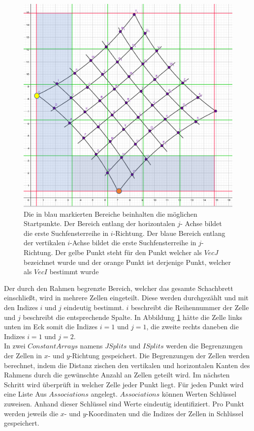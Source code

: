 \begin{figure}[!htb]
	\centering
	\includegraphics[width=0.6\linewidth]{images/VerzeichnetesSchachbrett_1.png}
	\caption[Startpunktsuche in Schachbrettpunkten]{Die in blau markierten Bereiche beinhalten die möglichen Startpunkte. Der Bereich entlang der horizontalen $j$- Achse bildet die erste Suchfensterreihe in $i$-Richtung. Der blaue Bereich entlang der vertikalen $i$-Achse bildet die erste Suchfensterreihe in $j$-Richtung. Der gelbe Punkt steht für den Punkt welcher als $VecJ$ bezeichnet wurde und der orange Punkt ist derjenige Punkt, welcher als $VecI$ bestimmt wurde}
	\label{fig:7.1}
\end{figure}

Der durch den Rahmen begrenzte Bereich, welcher das gesamte Schachbrett einschließt, wird in mehrere Zellen eingeteilt. Diese werden durchgezählt und mit den Indizes $i$ und $j$ eindeutig bestimmt. $i$ beschreibt die Reihennummer der Zelle und $j$ beschreibt die entsprechende Spalte. In Abbildung \ref{fig:7.1} hätte die Zelle links unten im Eck somit die Indizes $i = 1$ und $j = 1$, die zweite rechts daneben die Indizes $i = 1$ und $j= 2$.\\

In zwei $ConstantArrays$ namens $JSplits$ und $ISplits$ werden die Begrenzungen der Zellen  in $x$- und $y$-Richtung gespeichert. Die Begrenzungen der Zellen werden berechnet, indem die Distanz zischen den vertikalen und horizontalen Kanten des Rahmens durch die gewünschte Anzahl an Zellen geteilt wird. Im nächsten Schritt wird überprüft in welcher Zelle jeder Punkt liegt. Für jeden Punkt wird eine Liste Aus $Associations$ angelegt.  $Associations$ können Werten Schlüssel zuweisen. Anhand dieser Schlüssel sind Werte eindeutig identifiziert\cite{Mathematica}. Pro Punkt werden jeweils die $x$- und $y$-Koordinaten und die Indizes der Zellen in Schlüssel gespeichert.

